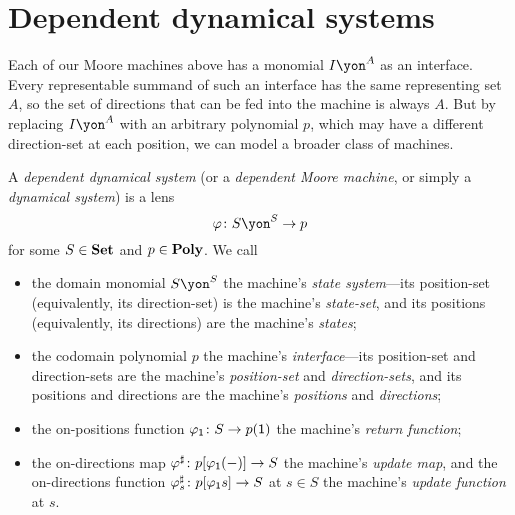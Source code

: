 \documentclass[Book-Poly]{subfiles}
\begin{document}

\section{Dependent dynamical systems}\label{sec.poly.dyn_sys.depend_sys}


Each of our Moore machines above has a monomial $I\yon^A$ as an interface.
Every representable summand of such an interface has the same representing set $A$, so the set of directions that can be fed into the machine is always $A$.
But by replacing $I\yon^A$ with an arbitrary polynomial $p$, which may have a different direction-set at each position, we can model a broader class of machines.

\begin{definition}\label{def.gen_moore}
  A \emph{dependent dynamical system} (or a \emph{dependent Moore machine}, or simply a \emph{dynamical system}) is a lens \[\varphi\colon S\yon^S\to p\] for some $S\in\mathbf{Set}$ and $p\in\mathbf{Poly}$.
  We call
  \begin{itemize}
    \item the domain monomial $S\yon^S$ the machine's \emph{state system}---its position-set (equivalently, its direction-set) is the machine's \emph{state-set}, and its positions (equivalently, its directions) are the machine's \emph{states};
    \item the codomain polynomial $p$ the machine's \emph{interface}---its position-set and direction-sets are the machine's \emph{position-set} and \emph{direction-sets}, and its positions and directions are the machine's \emph{positions} and \emph{directions};
    \item the on-positions function $\varphi_{\textsf{1}}\colon S\to p(\textsf{1})$ the machine's \emph{return function};
    \item the on-directions map $\varphi^\sharp\colon p[\varphi_{\textsf{1}}(-)]\to S$ the machine's \emph{update map}, and the on-directions function $\varphi^\sharp_s\colon p[\varphi_{\textsf{1}}s]\to S$ at $s\in S$ the machine's \emph{update function} at $s$.
  \end{itemize}
\end{definition}
\end{document}
